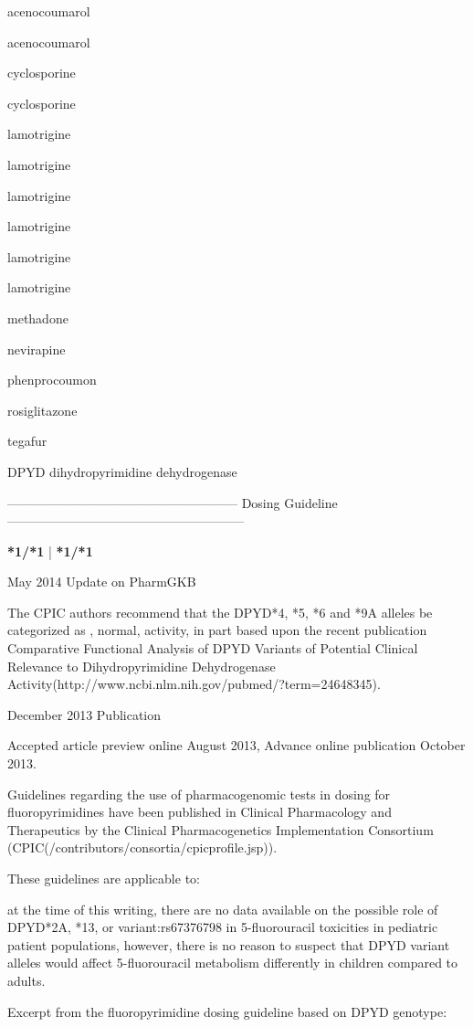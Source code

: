 \documentclass{resume} %
\begin{document}
\begin{rSection}{ acenocoumarol }
\begin{rSection}{ acenocoumarol }
\begin{rSection}{ cyclosporine }
\begin{rSection}{ cyclosporine }
\begin{rSection}{ lamotrigine }
\begin{rSection}{ lamotrigine }
\begin{rSection}{ lamotrigine }
\begin{rSection}{ lamotrigine }
\begin{rSection}{ lamotrigine }
\begin{rSection}{ lamotrigine }
\begin{rSection}{ methadone }
\begin{rSection}{ nevirapine }
\begin{rSection}{ phenprocoumon }
\begin{rSection}{ rosiglitazone }
\end{rSection}
\begin{rSection}{ tegafur }
\item[]
\begin{rSubsection}{ DPYD }{ dihydropyrimidine dehydrogenase }{}{}
\item[]
\item[] ------------------------------------------------------ Dosing Guideline --------------------------------------------------------\newline
\item[]
\item[] \textbf{ *1/*1 } | \textbf{ *1/*1 }
\item May 2014 Update on PharmGKB
 \newline
\item The CPIC authors recommend that the DPYD*4, *5, *6 and *9A alleles be categorized as , normal,  activity, in part based upon the recent publication Comparative Functional Analysis of DPYD Variants of Potential Clinical Relevance to Dihydropyrimidine Dehydrogenase Activity(http://www.ncbi.nlm.nih.gov/pubmed/?term=24648345). 
 \newline
\item December 2013 Publication
 \newline
\item Accepted article preview online August 2013,  Advance online publication October 2013.
 \newline
\item Guidelines regarding the use of pharmacogenomic tests in dosing for fluoropyrimidines have been published in Clinical Pharmacology and Therapeutics by the Clinical Pharmacogenetics Implementation Consortium (CPIC(/contributors/consortia/cpicprofile.jsp)).
 \newline
\item These guidelines are applicable to:
 \newline
\item at the time of this writing, there are no data available on the possible role of DPYD*2A, *13, or variant:rs67376798 in 5-fluorouracil toxicities in pediatric patient populations,  however, there is no reason to suspect that DPYD variant alleles would affect 5-fluorouracil metabolism differently in children compared to adults.
 \newline
\item Excerpt from the fluoropyrimidine dosing guideline based on DPYD genotype:
 \newline

\end{rSubsection}
\end{rSection}
\end{rSection}
\end{rSection}
\end{rSection}
\end{rSection}
\end{rSection}
\end{rSection}
\end{rSection}
\end{rSection}
\end{rSection}
\end{rSection}
\end{rSection}
\end{rSection}
\end{rSection}
\end{document}
